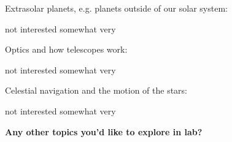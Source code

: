 \documentclass[12pt]{article}
\begin{document}
\vspace{0.1in}

Extrasolar planets, e.g. planets outside of our solar system:
\begin{center}
	not interested \hspace{0.3in} somewhat \hspace{0.3in} very
\end{center}

\vspace{0.1in}

Optics and how telescopes work:
\begin{center}
	not interested \hspace{0.3in} somewhat \hspace{0.3in} very
\end{center}

\vspace{0.1in}

Celestial navigation and the motion of the stars:
\begin{center}
	not interested \hspace{0.3in} somewhat \hspace{0.3in} very
\end{center}

\vspace{0.2in}
\noindent\textbf{Any other topics you'd like to explore in lab?}
\vspace{0.4in}


	




\end{document}
